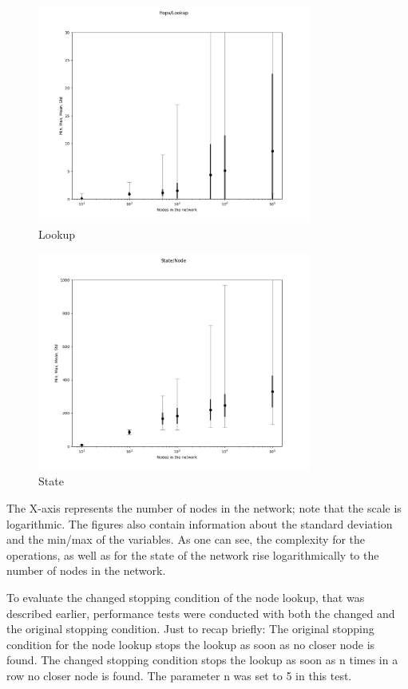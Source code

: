 \documentclass[a4paper, 12pt]{article} %
\begin{document}
\begin{figure}[ht]
    \caption{Lookup}
    \centering
    \includegraphics[width=0.80\textwidth]{images/lookup_figure.png}
\end{figure}

\begin{figure}[ht]
    \caption{State}
    \centering
    \includegraphics[width=0.80\textwidth]{images/state_figure.png}
\end{figure}

The X-axis represents the number of nodes in the network; note that the scale is logarithmic. The figures also contain information about the standard deviation and the min/max of the variables. As one can see, the complexity for the operations, as well as for the state of the network rise logarithmically to the number of nodes in the network. 

\clearpage

To evaluate the changed stopping condition of the node lookup, that was described earlier, performance tests were conducted with both the changed and the original stopping condition. Just to recap briefly: The original stopping condition for the node lookup stops the lookup as soon as no closer node is found. The changed stopping condition stops the lookup as soon as n times in a row no closer node is found. The parameter n was set to 5 in this test. 
\end{document}
